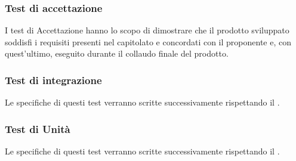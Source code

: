 \subsubsection{Test di accettazione}
I test di Accettazione hanno lo scopo di dimostrare che il prodotto sviluppato soddisfi i requisiti presenti nel capitolato e concordati con il proponente e, con quest'ultimo, eseguito durante il collaudo finale del prodotto.

\subsubsection{Test di integrazione}
Le specifiche di questi test verranno scritte successivamente rispettando il .
\subsubsection{Test di Unità}
Le specifiche di questi test verranno scritte successivamente rispettando il .
